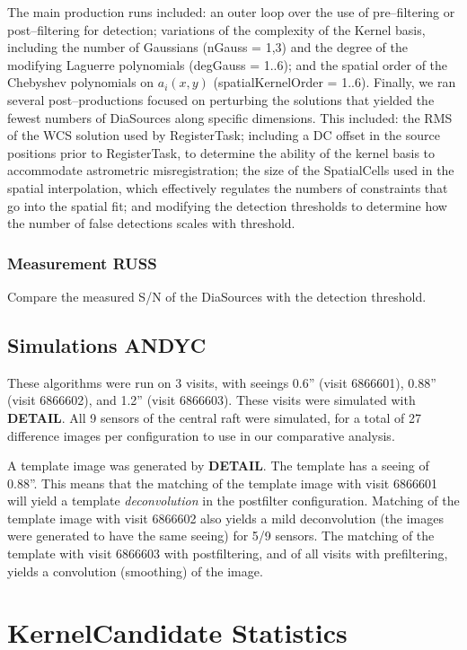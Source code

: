 \documentclass[prd, nofootinbib, floatfix, 11pt,tightenlines,times]{article}
\begin{document}
The main production runs included: an outer loop over the use of
pre--filtering or post--filtering for detection; variations of the
complexity of the Kernel basis, including the number of Gaussians
(nGauss = 1,3) and the degree of the modifying Laguerre polynomials
(degGauss = 1..6); and the spatial order of the Chebyshev polynomials
on $a_i(x,y)$ (spatialKernelOrder = 1..6).  Finally, we ran several
post--productions focused on perturbing the solutions that yielded the
fewest numbers of DiaSources along specific dimensions.  This
included: the RMS of the WCS solution used by RegisterTask; including
a DC offset in the source positions prior to RegisterTask, to
determine the ability of the kernel basis to accommodate astrometric
misregistration; the size of the SpatialCells used in the spatial
interpolation, which effectively regulates the numbers of constraints
that go into the spatial fit; and modifying the detection thresholds
to determine how the number of false detections scales with threshold.

\subsubsection{Measurement {\bf RUSS}}

Compare the measured S/N of the DiaSources with the detection threshold.

\subsection{Simulations {\bf ANDYC}}

These algorithms were run on 3 visits, with seeings 0.6'' (visit
6866601), 0.88'' (visit 6866602), and 1.2'' (visit 6866603).  These
visits were simulated with {\bf DETAIL}.  All 9 sensors of the central
raft were simulated, for a total of 27 difference images per
configuration to use in our comparative analysis.

A template image was generated by {\bf DETAIL}.  The template has a
seeing of 0.88''.  This means that the matching of the template image
with visit 6866601 will yield a template {\it deconvolution} in the
postfilter configuration.  Matching of the template image with visit
6866602 also yields a mild deconvolution (the images were generated to
have the same seeing) for 5/9 sensors.  The matching of the template
with visit 6866603 with postfiltering, and of all visits with
prefiltering, yields a convolution (smoothing) of the image.

\section{KernelCandidate Statistics}
\end{document}
